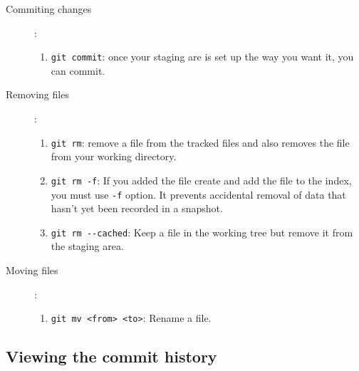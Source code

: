 \documentclass[french]{article}
\begin{document}
\begin{description}
    \item[Commiting changes]:
        \begin{enumerate}
            \item[-] \lstinline{git commit}: once your staging are is set up the way you want it, you can commit.
        \end{enumerate}
    \item[Removing files]:
        \begin{enumerate}
            \item[-] \lstinline{git rm}: remove a file from the tracked files and also removes the file from your working directory.
            \item[-] \lstinline{git rm -f}: If you added the file create and add the file to the index, you must use \lstinline{-f} option. It prevents accidental removal of data that hasn't yet been recorded in a snapshot.
            \item[-] \lstinline{git rm --cached}: Keep a file in the working tree but remove it from the staging area.
        \end{enumerate}
    \item[Moving files]:
        \begin{enumerate}
            \item[-] \lstinline{git mv <from> <to>}: Rename a file.
        \end{enumerate}
\end{description}

\subsection{Viewing the commit history}
\end{document}

